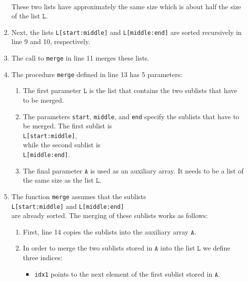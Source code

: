 \begin{enumerate}
      \\[0.2cm]
      These two lists have approximately the same size which is about half the size of the list $\texttt{L}$.
\item Next, the lists \texttt{L[start:middle]} and \texttt{L[middle:end]} are sorted
      recursively in line 9 and 10, respectively.
\item The call to \texttt{merge} in line 11 merges these lists.
\item The procedure \texttt{merge} defined in line 13 has 5 parameters: 
      \begin{enumerate}
      \item The first parameter $\texttt{L}$ is the list that contains the two sublists that have to be merged.
      \item The parameters \texttt{start}, \texttt{middle}, and \texttt{end} specify the sublists
            that have to be merged.  The first sublist is 
            \\[0.2cm]
            \hspace*{1.3cm} 
            \texttt{L[start:middle]}, 
            \\[0.2cm]
            while the second sublist is \\[0.2cm]
            \hspace*{1.3cm} 
            \texttt{L[middle:end]}. 
      \item The final parameter $\texttt{A}$ is used as an auxiliary array.  It needs to be a list of the
            same size as the list $\texttt{L}$.
      \end{enumerate}
\item The function \texttt{merge} assumes that the sublists 
      \\[0.2cm]
      \hspace*{1.3cm}
      \texttt{L[start:middle]} \quad and \quad \texttt{L[middle:end]} 
      \\[0.2cm]
      are already sorted.  The merging of these sublists works as follows:
      \begin{enumerate}
      \item First, line 14 copies the sublists into the auxiliary array $\texttt{A}$.
      \item In order to merge the two sublists stored in $\texttt{A}$ into the list $\texttt{L}$ we define
            three indices: 
            \begin{itemize}
            \item \texttt{idx1} points to the next element of the first sublist stored in $\texttt{A}$.

\end{itemize}
\end{enumerate}
\end{enumerate}
